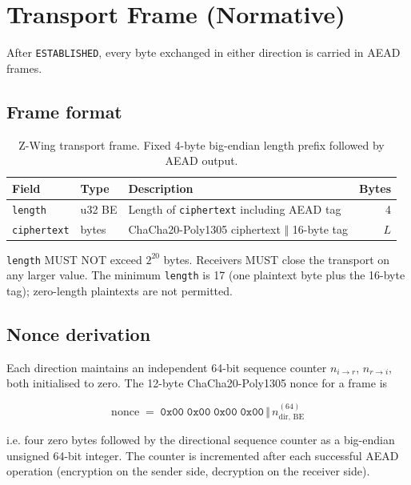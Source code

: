 \documentclass[11pt,a4paper]{article}
\begin{document}
\section{Transport Frame (Normative)}
\label{sec:transport}

After \texttt{ESTABLISHED}, every byte exchanged in either direction is
carried in AEAD frames.

\subsection{Frame format}

\begin{table}[H]
\centering
\begin{tabularx}{\textwidth}{llXr}
\toprule
\textbf{Field} & \textbf{Type} & \textbf{Description} & \textbf{Bytes} \\
\midrule
\texttt{length}     & u32 BE & Length of \texttt{ciphertext} including AEAD tag    & 4 \\
\texttt{ciphertext} & bytes  & ChaCha20-Poly1305 ciphertext $\Vert$ 16-byte tag    & $L$ \\
\bottomrule
\end{tabularx}
\caption{Z-Wing transport frame. Fixed 4-byte big-endian length prefix
followed by AEAD output.}
\end{table}

\texttt{length} MUST NOT exceed $2^{20}$ bytes. Receivers MUST close the
transport on any larger value. The minimum \texttt{length} is 17 (one
plaintext byte plus the 16-byte tag); zero-length plaintexts are not
permitted.

\subsection{Nonce derivation}

Each direction maintains an independent 64-bit sequence counter
$n_{i\to r}$, $n_{r\to i}$, both initialised to zero. The 12-byte
ChaCha20-Poly1305 nonce for a frame is

\begin{equation}
\mathrm{nonce} \;=\; \texttt{0x00}\;\texttt{0x00}\;\texttt{0x00}\;\texttt{0x00} \,\Vert\, n_{\text{dir, BE}}^{(64)}
\end{equation}

i.e. four zero bytes followed by the directional sequence counter as a
big-endian unsigned 64-bit integer. The counter is incremented after
each successful AEAD operation (encryption on the sender side,
decryption on the receiver side).
\end{document}
